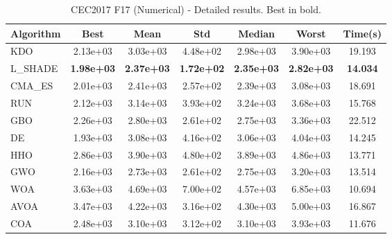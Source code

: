 \begin{table}[H]
\centering\small
\caption{CEC2017 F17 (Numerical) - Detailed results. Best in bold.}
\label{tab:cec2017_F17}
\begin{tabular}{lcccccc}
\toprule
\textbf{Algorithm} & \textbf{Best} & \textbf{Mean} & \textbf{Std} & \textbf{Median} & \textbf{Worst} & \textbf{Time(s)} \\
\midrule
KDO & 2.13e+03 & 3.03e+03 & 4.48e+02 & 2.98e+03 & 3.90e+03 & 19.193 \\
L_SHADE & \textbf{1.98e+03} & \textbf{2.37e+03} & \textbf{1.72e+02} & \textbf{2.35e+03} & \textbf{2.82e+03} & \textbf{14.034} \\
CMA_ES & 2.01e+03 & 2.41e+03 & 2.57e+02 & 2.39e+03 & 3.08e+03 & 18.691 \\
RUN & 2.12e+03 & 3.14e+03 & 3.93e+02 & 3.24e+03 & 3.68e+03 & 15.768 \\
GBO & 2.26e+03 & 2.80e+03 & 2.61e+02 & 2.75e+03 & 3.36e+03 & 22.512 \\
DE & 1.93e+03 & 3.08e+03 & 4.16e+02 & 3.06e+03 & 4.04e+03 & 14.245 \\
HHO & 2.86e+03 & 3.90e+03 & 4.80e+02 & 3.89e+03 & 4.86e+03 & 13.771 \\
GWO & 2.16e+03 & 2.73e+03 & 2.61e+02 & 2.75e+03 & 3.20e+03 & 13.514 \\
WOA & 3.63e+03 & 4.69e+03 & 7.00e+02 & 4.57e+03 & 6.85e+03 & 10.694 \\
AVOA & 3.47e+03 & 4.22e+03 & 3.16e+02 & 4.30e+03 & 5.00e+03 & 16.867 \\
COA & 2.48e+03 & 3.10e+03 & 3.12e+02 & 3.10e+03 & 3.93e+03 & 11.676 \\
\bottomrule
\end{tabular}
\end{table}
